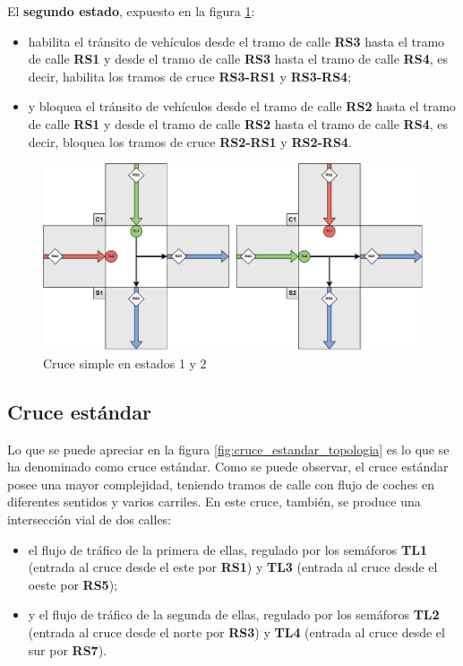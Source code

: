 El \textbf{segundo estado}, expuesto en la figura \ref{fig:cruce_simple_estados_1y2}:
\begin{itemize}
    \item habilita el tránsito de vehículos desde el tramo de calle \textbf{RS3} hasta el tramo de calle \textbf{RS1} y desde el tramo de calle \textbf{RS3} hasta el tramo de calle \textbf{RS4}, es decir, habilita los tramos de cruce \textbf{RS3-RS1} y \textbf{RS3-RS4};
    \item y bloquea el tránsito de vehículos desde el tramo de calle \textbf{RS2} hasta el tramo de calle \textbf{RS1} y desde el tramo de calle \textbf{RS2} hasta el tramo de calle \textbf{RS4}, es decir, bloquea los tramos de cruce \textbf{RS2-RS1} y \textbf{RS2-RS4}.
\end{itemize}

\begin{figure}[H]
    \centering
    \includegraphics[width=1\linewidth]{text/image/DCruc-CS-Estados1y2.pdf}
    \caption{Cruce simple en estados 1 y 2}
    \label{fig:cruce_simple_estados_1y2}
\end{figure}

\newpage
\subsection{Cruce estándar}
    \label{subsection:cruce_estandar}
Lo que se puede apreciar en la figura \ref{fig:cruce_estandar_topologia} es lo que se ha denominado como cruce estándar. Como se puede observar, el cruce estándar posee una mayor complejidad, teniendo tramos de calle con flujo de coches en diferentes sentidos y varios carriles. En este cruce, también, se produce una intersección vial de dos calles: 
\begin{itemize}
    \item el flujo de tráfico de la primera de ellas, regulado por los semáforos \textbf{TL1} (entrada al cruce desde el este por \textbf{RS1}) y \textbf{TL3} (entrada al cruce desde el oeste por \textbf{RS5}); 
    \item y el flujo de tráfico de la segunda de ellas, regulado por los semáforos \textbf{TL2} (entrada al cruce desde el norte por \textbf{RS3}) y \textbf{TL4} (entrada al cruce desde el sur por \textbf{RS7}).
\end{itemize}

